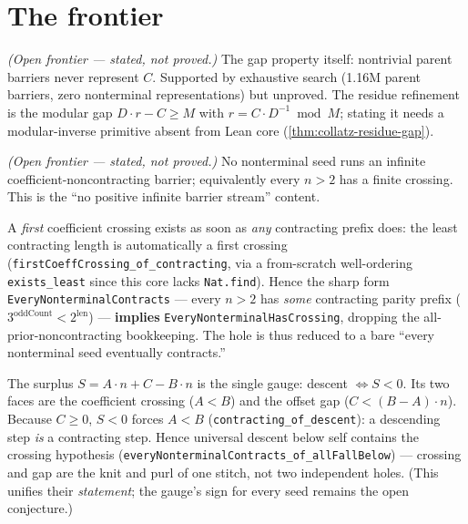 \section{The frontier}

\begin{theorem}
  \label{thm:collatz-gap-holds}
  \notready
  \emph{(Open frontier --- stated, not proved.)} The gap property itself: nontrivial parent
  barriers never represent $C$. Supported by exhaustive search (1.16M parent barriers, zero
  nonterminal representations) but unproved. The residue refinement is the modular gap
  $D\cdot r-C\ge M$ with $r=C\cdot D^{-1}\bmod M$; stating it needs a modular-inverse primitive
  absent from Lean core (\cref{thm:collatz-residue-gap}).
\end{theorem}
\begin{theorem}
  \label{thm:collatz-crossing-holds}
  \notready
  \emph{(Open frontier --- stated, not proved.)} No nonterminal seed runs an infinite
  coefficient-noncontracting barrier; equivalently every $n>2$ has a finite crossing. This is
  the ``no positive infinite barrier stream'' content.
\end{theorem}
\begin{theorem}
  \label{thm:collatz-crossing-reduces}
  \leanok
  A \emph{first} coefficient crossing exists as soon as \emph{any} contracting prefix does: the
  least contracting length is automatically a first crossing (\texttt{firstCoeffCrossing\_of\_contracting},
  via a from-scratch well-ordering \texttt{exists\_least} since this core lacks \texttt{Nat.find}).
  Hence the sharp form \texttt{EveryNonterminalContracts} --- every $n>2$ has \emph{some}
  contracting parity prefix ($3^{\mathrm{oddCount}}<2^{\mathrm{len}}$) --- \textbf{implies}
  \texttt{EveryNonterminalHasCrossing}, dropping the all-prior-noncontracting bookkeeping. The hole
  is thus reduced to a bare ``every nonterminal seed eventually contracts.''
\end{theorem}
\begin{theorem}
  \label{thm:collatz-purl}
  \leanok
  The surplus $S=A\cdot n+C-B\cdot n$ is the single gauge: descent $\iff S<0$. Its two faces are
  the coefficient crossing ($A<B$) and the offset gap ($C<(B-A)\cdot n$). Because $C\ge0$, $S<0$
  forces $A<B$ (\texttt{contracting\_of\_descent}): a descending step \emph{is} a contracting step.
  Hence universal descent below self contains the crossing hypothesis
  (\texttt{everyNonterminalContracts\_of\_allFallBelow}) --- crossing and gap are the knit and purl
  of one stitch, not two independent holes. (This unifies their \emph{statement}; the gauge's sign
  for every seed remains the open conjecture.)
\end{theorem}
